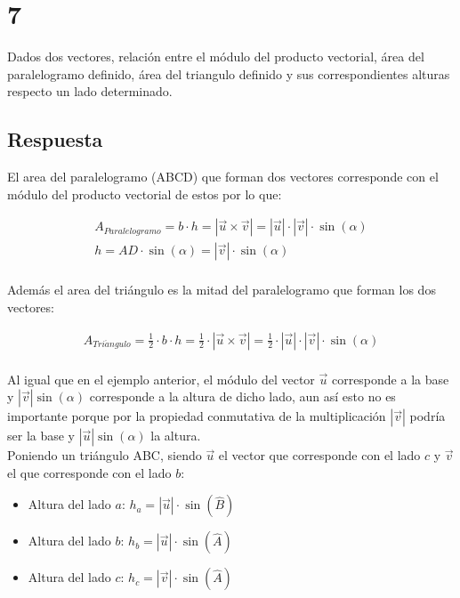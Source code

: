 \documentclass[
	12pt, %
	spanish, %
]{fphw}
\newcommand{\vu}{\vec{u}}
\newcommand{\vv}{\vec{v}}
\begin{document}
\section*{7}
\begin{problem}
	Dados dos vectores, relación entre el módulo del producto vectorial, área del
paralelogramo definido, área del triangulo definido y sus correspondientes
alturas respecto un lado determinado.
\end{problem}

\subsection*{Respuesta}

El area del paralelogramo (ABCD) que forman dos vectores corresponde con el módulo del producto vectorial de estos por lo que:

\begin{gather*}
	A_{Paralelogramo} = b \cdot h = |\vu \times \vv| = |\vu| \cdot |\vv| \cdot \sin(\alpha) \\
	h = AD \cdot \sin(\alpha) = |\vv| \cdot \sin(\alpha)\\
\end{gather*}

Además el area del triángulo es la mitad del paralelogramo que forman los dos vectores:

\begin{gather*}
A_{Tri\acute{a}ngulo} = \frac {1} {2} \cdot b \cdot h = \frac{1}{2} \cdot |\vu \times \vv| = \frac{1}{2} \cdot |\vu| \cdot |\vv| \cdot \sin(\alpha)\\
\end{gather*}

Al igual que en el ejemplo anterior, el módulo del vector $\vu$ corresponde a la base y $|\vv|\sin(\alpha)$ corresponde a la altura de dicho lado, aun así esto no es importante porque por la propiedad conmutativa de la multiplicación $|\vv|$ podría ser la base y $|\vu|\sin(\alpha)$ la altura.\\

Poniendo un triángulo ABC, siendo $\vu$ el vector que corresponde con el lado $c$ y $\vv$ el que corresponde con el lado $b$:

\begin{itemize}
	\item Altura del lado $a$: $h_a= |\vu|\cdot\sin(\hat{B})$
	\item Altura del lado $b$: $h_b= |\vu|\cdot\sin(\hat{A})$
	\item Altura del lado $c$: $h_c= |\vv|\cdot\sin(\hat{A})$
\end{itemize}
\end{document}

